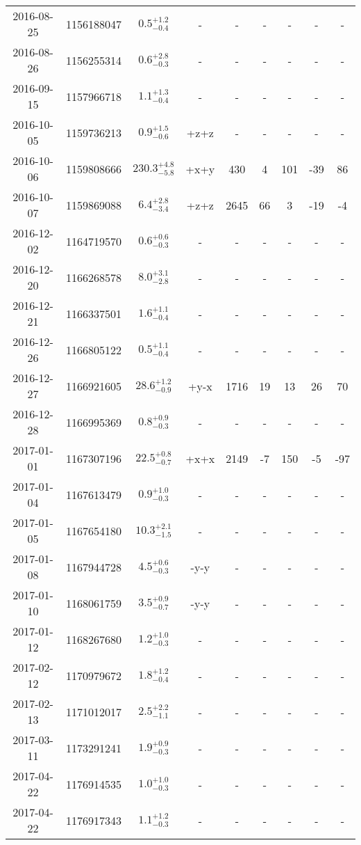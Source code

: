\begin{longtable}{|c|c|c|c|c|c|c|c|c|}
	2016-08-25 & 1156188047 & $ 0.5^{+1.2}_{-0.4}$ & - & - & - & - & - & - \\
	2016-08-26 & 1156255314 & $ 0.6^{+2.8}_{-0.3}$ & - & - & - & - & - & - \\
	2016-09-15 & 1157966718 & $ 1.1^{+1.3}_{-0.4}$ & - & - & - & - & - & - \\
	2016-10-05 & 1159736213 & $ 0.9^{+1.5}_{-0.6}$ & +z+z & - & - & - & - & - \\
	2016-10-06 & 1159808666 & $230.3^{+4.8}_{-5.8}$ & +x+y & 430 & 4 & 101 & -39 & 86 \\
	2016-10-07 & 1159869088 & $ 6.4^{+2.8}_{-3.4}$ & +z+z & 2645 & 66 & 3 & -19 & -4 \\
	2016-12-02 & 1164719570 & $ 0.6^{+0.6}_{-0.3}$ & - & - & - & - & - & - \\
	2016-12-20 & 1166268578 & $ 8.0^{+3.1}_{-2.8}$ & - & - & - & - & - & - \\
	2016-12-21 & 1166337501 & $ 1.6^{+1.1}_{-0.4}$ & - & - & - & - & - & - \\
	2016-12-26 & 1166805122 & $ 0.5^{+1.1}_{-0.4}$ & - & - & - & - & - & - \\
	2016-12-27 & 1166921605 & $28.6^{+1.2}_{-0.9}$ & +y-x & 1716 & 19 & 13 & 26 & 70 \\
	2016-12-28 & 1166995369 & $ 0.8^{+0.9}_{-0.3}$ & - & - & - & - & - & - \\
	2017-01-01 & 1167307196 & $22.5^{+0.8}_{-0.7}$ & +x+x & 2149 & -7 & 150 & -5 & -97 \\
	2017-01-04 & 1167613479 & $ 0.9^{+1.0}_{-0.3}$ & - & - & - & - & - & - \\
	2017-01-05 & 1167654180 & $10.3^{+2.1}_{-1.5}$ & - & - & - & - & - & - \\
	2017-01-08 & 1167944728 & $ 4.5^{+0.6}_{-0.3}$ & -y-y & - & - & - & - & - \\
	2017-01-10 & 1168061759 & $ 3.5^{+0.9}_{-0.7}$ & -y-y & - & - & - & - & - \\
	2017-01-12 & 1168267680 & $ 1.2^{+1.0}_{-0.3}$ & - & - & - & - & - & - \\
	2017-02-12 & 1170979672 & $ 1.8^{+1.2}_{-0.4}$ & - & - & - & - & - & - \\
	2017-02-13 & 1171012017 & $ 2.5^{+2.2}_{-1.1}$ & - & - & - & - & - & - \\
	2017-03-11 & 1173291241 & $ 1.9^{+0.9}_{-0.3}$ & - & - & - & - & - & - \\
	2017-04-22 & 1176914535 & $ 1.0^{+1.0}_{-0.3}$ & - & - & - & - & - & - \\
	2017-04-22 & 1176917343 & $ 1.1^{+1.2}_{-0.3}$ & - & - & - & - & - & - \\

\end{longtable}
